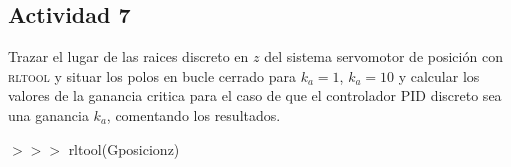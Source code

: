 \newpage
\subsection{Actividad 7}
Trazar el lugar de las raices discreto en $z$ del sistema
servomotor de posición con \textsc{rltool} y situar los polos en bucle
cerrado para $k_a=1$, $k_a=10$ y calcular los valores de la ganancia
critica para el caso de que el controlador PID discreto sea una
ganancia $k_a$, comentando los resultados.

\begin{tcolorbox}[sharp corners, colframe=bluebox, title= Polos en
  bucle cerrado.,breakable = unlimited]
  $>>>$ rltool(Gposicionz)\\
  \vspace*{0.35em}

\end{tcolorbox}%

